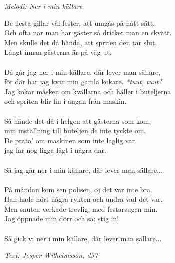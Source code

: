 {\footnotesize\textit{Melodi: Ner i min källare}}\par
\vspace{10pt}
De flesta gillar väl fester, att umgås på nått sätt.\\
Och ofta när man har gäster så dricker man en skvätt.\\
Men skulle det då hända, att spriten den tar slut,\\
Långt innan gästerna är på väg ut.\\
\\
Då går jag ner i min källare, där lever man sällare,\\
för där har jag kvar min gamla kokare. \textit{*tuut, tuut*}\\
Jag kokar mäsken om kvällarna och häller i buteljerna \\
och spriten blir fin i ångan från maskin.\\
\\
Så hände det då i helgen att gästerna som kom, \\
min inställning till buteljen de inte tyckte om.\\
De prata' om maskinen som inte laglig var\\
jag får nog ligga lågt i några dar.\\
\\
Så jag går ner i min källare, där lever man sällare...\\
\\
På måndan kom sen polisen, oj det var inte bra.\\
Han hade hört några rykten och undra vad det var.\\
Men snuten verkade trevlig, med festarsugen min.\\
Jag öppnade min dörr och sa: stig in!\\
\\
Så gick vi ner i min källare, där lever man sällare...
\par
\vspace{10pt}
{\footnotesize\textit{Text: Jesper Wilhelmsson, d97}}
